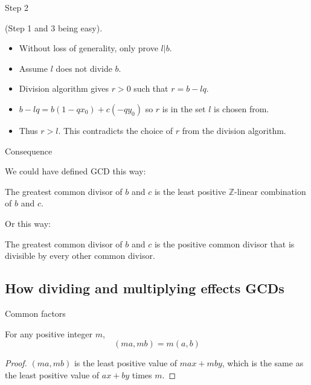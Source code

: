 \documentclass{beamer}
\begin{document}
\begin{frame}{Step 2}

  (Step 1 and 3 being easy).
  
  \begin{itemize}
  \item Without loss of generality, only prove $l | b$.
  \item Assume $l$ does not divide $b$.
  \item Division algorithm gives $r > 0$ such that $r = b - lq$.
  \item $b - lq = b(1 - qx_0) + c(-qy_0)$ so $r$ is in the set $l$ is
    chosen from.
  \item Thus $r > l$. This contradicts the choice of $r$ from the
    division algorithm.
  \end{itemize}
\end{frame}

\begin{frame}{Consequence}

  We could have defined GCD this way:
  \begin{theorem} The greatest common divisor of $b$ and $c$ is the
    least positive $\mathbb{Z}$-linear combination of $b$ and $c$.
  \end{theorem}
  
  Or this way:
  \begin{theorem} The greatest common divisor of $b$ and $c$ is the
    positive common divisor  that is divisible by every other common
    divisor.
  \end{theorem}

\end{frame}

\subsection{How dividing and multiplying effects GCDs}

\begin{frame}{Common factors}

  \begin{theorem} For any positive integer $m$, 
    $$(ma, mb) = m(a, b)$$
  \end{theorem}
  
  \begin{proof}
    $(ma, mb)$ is the least positive value of $max+mby$, which is the
    same as the least positive value of $ax+by$ times $m$.
  \end{proof}
  
\end{frame}
\end{document}
